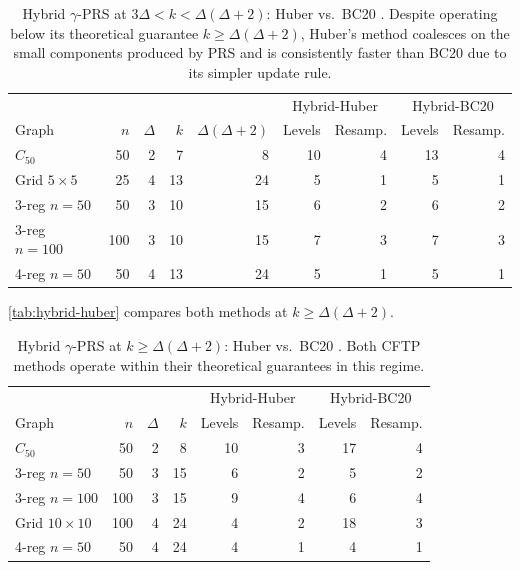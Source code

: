 \documentclass[12pt, a4paper]{article}
\theoremstyle{plain}
\theoremstyle{definition}
\theoremstyle{remark}
\begin{document}
\begin{table}[ht]
\centering
\begin{tabular}{l r r r r | r r | r r}
\hline
 & & & & & \multicolumn{2}{c|}{Hybrid-Huber} & \multicolumn{2}{c}{Hybrid-BC20} \\
Graph & \(n\) & \(\Delta\) & \(k\) & \(\Delta(\Delta\!+\!2)\) & Levels & Resamp. & Levels & Resamp. \\
\hline
\(C_{50}\) & 50 & 2 & 7 & 8 & 10 & 4 & 13 & 4 \\
Grid \(5\times5\) & 25 & 4 & 13 & 24 & 5 & 1 & 5 & 1 \\
3-reg \(n\!=\!50\) & 50 & 3 & 10 & 15 & 6 & 2 & 6 & 2 \\
3-reg \(n\!=\!100\) & 100 & 3 & 10 & 15 & 7 & 3 & 7 & 3 \\
4-reg \(n\!=\!50\) & 50 & 4 & 13 & 24 & 5 & 1 & 5 & 1 \\
\hline
\end{tabular}
\caption{Hybrid \(\gamma\)-PRS at \(3\Delta < k < \Delta(\Delta+2)\): Huber \cite{MH96} vs.\ BC20 \cite{BC20}. Despite operating below its theoretical guarantee \(k\geq\Delta(\Delta+2)\), Huber's method coalesces on the small components produced by PRS and is consistently faster than BC20 due to its simpler update rule.}
\label{tab:hybrid-cftp}
\end{table}

\autoref{tab:hybrid-huber} compares both methods at \(k\geq\Delta(\Delta+2)\).

\begin{table}[ht]
\centering
\begin{tabular}{l r r r | r r | r r}
\hline
 & & & & \multicolumn{2}{c|}{Hybrid-Huber} & \multicolumn{2}{c}{Hybrid-BC20} \\
Graph & \(n\) & \(\Delta\) & \(k\) & Levels & Resamp. & Levels & Resamp. \\
\hline
\(C_{50}\) & 50 & 2 & 8 & 10 & 3 & 17 & 4 \\
3-reg \(n\!=\!50\) & 50 & 3 & 15 & 6 & 2 & 5 & 2 \\
3-reg \(n\!=\!100\) & 100 & 3 & 15 & 9 & 4 & 6 & 4 \\
Grid \(10\times10\) & 100 & 4 & 24 & 4 & 2 & 18 & 3 \\
4-reg \(n\!=\!50\) & 50 & 4 & 24 & 4 & 1 & 4 & 1 \\
\hline
\end{tabular}
\caption{Hybrid \(\gamma\)-PRS at \(k\geq\Delta(\Delta+2)\): Huber \cite{MH96} vs.\ BC20 \cite{BC20}. Both CFTP methods operate within their theoretical guarantees in this regime.}
\label{tab:hybrid-huber}
\end{table}
\end{document}
